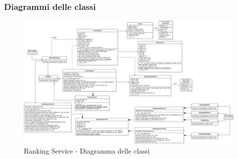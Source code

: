 \subsubsection{Diagrammi delle classi}
\begin{figure}[H]
    \centerfloat
    \includegraphics[scale=0.35]{Contenuto/Immagini/classi-RS.jpg}
    \caption{Ranking Service - Diagramma delle classi}
\end{figure}

